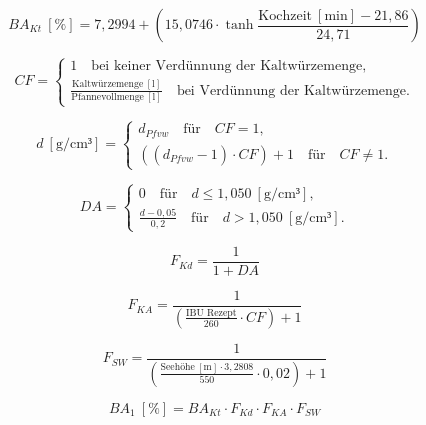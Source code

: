 \documentclass[a4paper,parskip=half]{scrartcl}
\newcommand{\BA}{\mathit{BA}}
\newcommand{\BAKt}{{\mathit{BA}}_{\mathit{Kt}}}
\newcommand{\umin}{\:[\textrm{min}]}
\newcommand{\uden}{\:[\text{g/cm³}]}
\newcommand{\uper}{\:[\text{\%}]}
\newcommand{\uli}{\:[\text{l}]}
\newcommand{\ume}{\:[\text{m}]}
\newcommand{\FKd}{F_{\mathit{Kd}}}
\newcommand{\FHR}{F_{\mathit{KA}}}
\newcommand{\FSP}{F_{\mathit{SW}}}
\newcommand{\dPfvw}{d_\mathit{Pfvw}}
\begin{document}
\begin{equation}
\BAKt \uper = 7,2994 + \left(15,0746 \cdot \tanh{\frac{\text{Kochzeit} \umin - 21,86}{24,71}}\right)
\label{eq:garetzbakt}
\end{equation}

\begin{equation}
\mathit{CF} = \begin{cases}
1 \quad \text{bei keiner Verdünnung der Kaltwürzemenge}, \\
\frac{\text{Kaltwürzemenge} \uli}{\text{Pfannevollmenge} \uli} \quad \text{bei Verdünnung der Kaltwürzemenge}.
\end{cases}
\label{eq:garetzcf}
\end{equation}

\begin{equation}
d \uden = \begin{cases}
\dPfvw \quad \text{für} \quad \mathit{CF} = 1, \\
\left( \left( \dPfvw - 1 \right) \cdot \mathit{CF} \right) + 1 \quad \text{für} \quad \mathit{CF} \ne 1.
\end{cases}
\label{eq:garetzbg}
\end{equation}

\begin{equation}
\mathit{DA} = \begin{cases}
0 \quad \text{für} \quad d \le 1,050 \uden, \\
\frac{d - 0,05}{0,2} \quad \text{für} \quad d > 1,050 \uden.
\end{cases}
\label{eq:garetzga}
\end{equation}

\begin{equation}
\FKd = \frac{1}{1 + DA}
\label{eq:garetzkd}
\end{equation}

\begin{equation}
\FHR = \frac{1}{\left( \frac{\text{IBU Rezept}}{260} \cdot \mathit{CF} \right) + 1}
\label{eq:garetzhr}
\end{equation}

\begin{equation}
\FSP = \frac{1}{\left(\frac{\text{Seehöhe} \ume \cdot 3,2808}{550} \cdot 0,02 \right) + 1}
\label{eq:garetzsp}
\end{equation}

\begin{equation}
\BA_1 \uper = \BAKt \cdot \FKd \cdot \FHR \cdot \FSP
\label{eq:garetzba1}
\end{equation}
\end{document}
